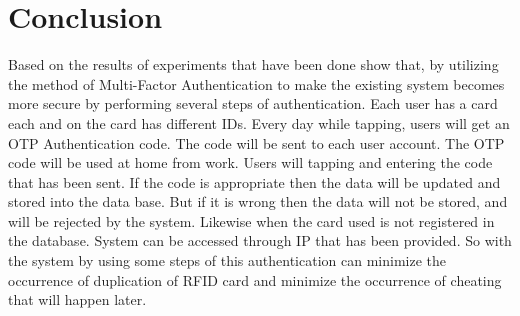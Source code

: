 \section{Conclusion}
\label{Conclusion}
Based on the results of experiments that have been done show that, by utilizing the method of Multi-Factor Authentication to make the existing system becomes more secure by performing several steps of authentication. Each user has a card each and on the card has different IDs. Every day while tapping, users will get an OTP Authentication code. The code will be sent to each user account. The OTP code will be used at home from work. Users will tapping and entering the code that has been sent. If the code is appropriate then the data will be updated and stored into the data base. But if it is wrong then the data will not be stored, and will be rejected by the system. Likewise when the card used is not registered in the database. System can be accessed through IP that has been provided. So with the system by using some steps of this authentication can minimize the occurrence of duplication of RFID card and minimize the occurrence of cheating that will happen later.